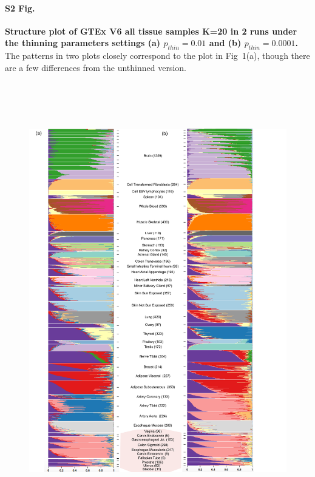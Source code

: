 \documentclass[10pt,letterpaper]{article}
\begin{document}
\paragraph*{S2 Fig.}
\label{figS2}
{\bf Structure plot of GTEx V6 all tissue samples K=20 in 2 runs under the thinning parameters settings (a) $p_{thin}=0.01$ and (b) $p_{thin}=0.0001$.} The patterns in two plots closely correspond to the plot in Fig~1(a), though there are a few differences from the unthinned version.
\begin{figure}[ht]
\centering
\includegraphics[height=7.5in, width=6.5in]{../../plots/gtex-figures/gtex_thinned_04_25_2016.pdf}
\end{figure}
\clearpage
\end{document}
